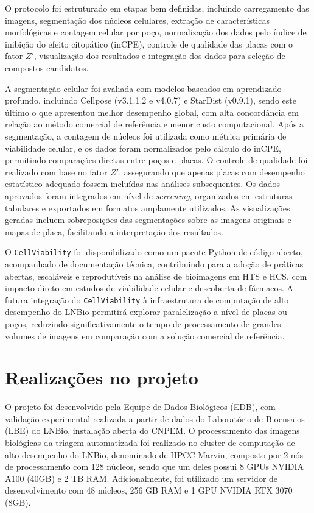 \documentclass[12pt]{article}
\begin{document}
O protocolo foi estruturado em etapas bem definidas, incluindo carregamento das imagens, segmentação dos núcleos celulares, extração de características morfológicas e contagem celular por poço, normalização dos dados pelo índice de inibição do efeito citopático (inCPE), controle de qualidade das placas com o fator $Z'$, visualização dos resultados e integração dos dados para seleção de compostos candidatos.

A segmentação celular foi avaliada com modelos baseados em aprendizado profundo, incluindo Cellpose (v3.1.1.2 e v4.0.7) e StarDist (v0.9.1), sendo este último o que apresentou melhor desempenho global, com alta concordância em relação ao método comercial de referência e menor custo computacional. Após a segmentação, a contagem de núcleos foi utilizada como métrica primária de viabilidade celular, e os dados foram normalizados pelo cálculo do inCPE, permitindo comparações diretas entre poços e placas. O controle de qualidade foi realizado com base no fator $Z'$, assegurando que apenas placas com desempenho estatístico adequado fossem incluídas nas análises subsequentes. Os dados aprovados foram integrados em nível de \textit{screening}, organizados em estruturas tabulares e exportados em formatos amplamente utilizados. As visualizações geradas incluem sobreposições das segmentações sobre as imagens originais e mapas de placa, facilitando a interpretação dos resultados.

O \texttt{CellViability} foi disponibilizado como um pacote Python de código aberto, acompanhado de documentação técnica, contribuindo para a adoção de práticas abertas, escaláveis e reprodutíveis na análise de bioimagens em HTS e HCS, com impacto direto em estudos de viabilidade celular e descoberta de fármacos. A futura integração do \texttt{CellViability} à infraestrutura de computação de alto desempenho do LNBio permitirá explorar paralelização a nível de placas ou poços, reduzindo significativamente o tempo de processamento de grandes volumes de imagens em comparação com a solução comercial de referência.

\section{Realizações no projeto}

O projeto foi desenvolvido pela Equipe de Dados Biológicos (EDB), com validação experimental realizada a partir de dados do Laboratório de Bioensaios (LBE) do LNBio, instalação aberta do CNPEM. O processamento das imagens biológicas da triagem automatizada foi realizado no cluster de computação de alto desempenho do LNBio, denominado de HPCC Marvin, composto por 2 nós de processamento com 128 núcleos, sendo que um deles possui 8 GPUs NVIDIA A100 (40GB) e 2 TB RAM. Adicionalmente, foi utilizado um servidor de desenvolvimento com 48 núcleos, 256 GB RAM e 1 GPU NVIDIA RTX 3070 (8GB).
\end{document}
